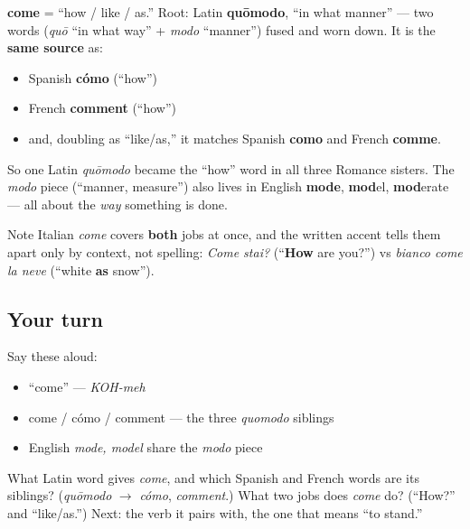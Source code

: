 \begin{cousinweb}
\textbf{come} = \textquotedblleft{}how / like / as.\textquotedblright{} Root: Latin \textbf{quōmodo}, \textquotedblleft{}in what manner\textquotedblright{} — two words (\emph{quō} \textquotedblleft{}in what way\textquotedblright{} + \emph{modo} \textquotedblleft{}manner\textquotedblright{}) fused and worn down. It is the \textbf{same source} as:

\begin{itemize}
\raggedright
  \item Spanish \textbf{cómo} (\textquotedblleft{}how\textquotedblright{})
  \item French \textbf{comment} (\textquotedblleft{}how\textquotedblright{})
  \item and, doubling as \textquotedblleft{}like/as,\textquotedblright{} it matches Spanish \textbf{como} and French \textbf{comme}.
\end{itemize}

So one Latin \emph{quōmodo} became the \textquotedblleft{}how\textquotedblright{} word in all three Romance sisters. The \emph{modo} piece (\textquotedblleft{}manner, measure\textquotedblright{}) also lives in English \textbf{mode}, \textbf{mod}el, \textbf{mod}erate — all about the \emph{way} something is done.

Note Italian \emph{come} covers \textbf{both} jobs at once, and the written accent tells them apart only by context, not spelling: \emph{Come stai?} (\textquotedblleft{}\textbf{How} are you?\textquotedblright{}) vs \emph{bianco come la neve} (\textquotedblleft{}white \textbf{as} snow\textquotedblright{}).
\end{cousinweb}

\subsection*{Your turn}
Say these aloud:

\begin{itemize}
\raggedright
  \item \textquotedblleft{}come\textquotedblright{} — \emph{KOH-meh}
  \item come / cómo / comment — the three \emph{quomodo} siblings
  \item English \emph{mode, model} share the \emph{modo} piece
\end{itemize}

\begin{tcolorbox}[breakable,colback=teal!4,colframe=teal!35!black,title={Before you move on}]
What Latin word gives \emph{come}, and which Spanish and French words are its siblings? (\emph{quōmodo} $\to$ \emph{cómo}, \emph{comment}.) What two jobs does \emph{come} do? (\textquotedblleft{}How?\textquotedblright{} and \textquotedblleft{}like/as.\textquotedblright{}) Next: the verb it pairs with, the one that means \textquotedblleft{}to stand.\textquotedblright{}
\end{tcolorbox}
